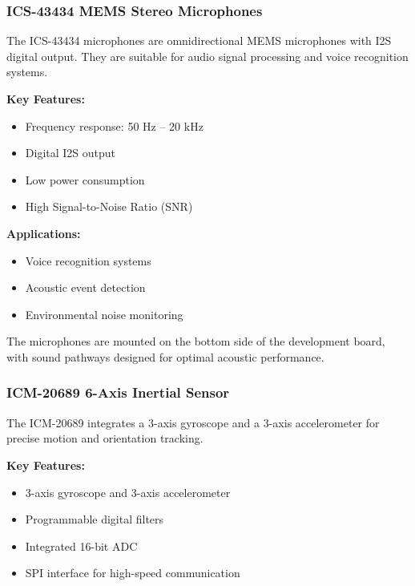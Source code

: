 \documentclass[
  9pt,
  letterpaper,
  abstract,
  titlepage]{scrbook}
\begin{document}
\subsubsection{ICS-43434 MEMS Stereo
Microphones}\label{ics-43434-mems-stereo-microphones}

The ICS-43434 microphones are omnidirectional MEMS microphones with I2S
digital output. They are suitable for audio signal processing and voice
recognition systems.

\textbf{Key Features:}

\begin{itemize}
\item
  Frequency response: 50 Hz -- 20 kHz
\item
  Digital I2S output
\item
  Low power consumption
\item
  High Signal-to-Noise Ratio (SNR)
\end{itemize}

\textbf{Applications:}

\begin{itemize}
\item
  Voice recognition systems
\item
  Acoustic event detection
\item
  Environmental noise monitoring
\end{itemize}

The microphones are mounted on the bottom side of the development board,
with sound pathways designed for optimal acoustic performance.

\subsubsection{ICM-20689 6-Axis Inertial
Sensor}\label{icm-20689-6-axis-inertial-sensor}

The ICM-20689 integrates a 3-axis gyroscope and a 3-axis accelerometer
for precise motion and orientation tracking.

\textbf{Key Features:}

\begin{itemize}
\item
  3-axis gyroscope and 3-axis accelerometer
\item
  Programmable digital filters
\item
  Integrated 16-bit ADC
\item
  SPI interface for high-speed communication
\end{itemize}
\end{document}
